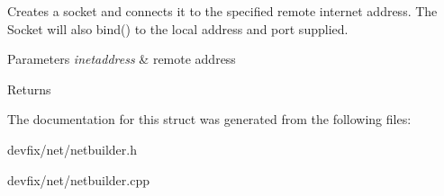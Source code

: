 Creates a socket and connects it to the specified remote internet address. The Socket will also bind() to the local address and port supplied. 


\begin{DoxyParams}{Parameters}
{\em inetaddress} & remote address \\
\hline
\end{DoxyParams}
\begin{DoxyReturn}{Returns}

\end{DoxyReturn}


The documentation for this struct was generated from the following files\+:\begin{DoxyCompactItemize}
\item 
devfix/net/netbuilder.\+h\item 
devfix/net/netbuilder.\+cpp\end{DoxyCompactItemize}
